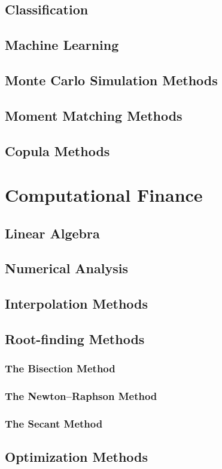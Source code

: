 \section{Classification}
\section{Machine Learning}
\section{Monte Carlo Simulation Methods}
\section{Moment Matching Methods}
\section{Copula Methods}

\chapter{Computational Finance}
\section{Linear Algebra}
\section{Numerical Analysis}
\section{Interpolation Methods}
\section{Root-finding Methods}
\subsection{The Bisection Method}
\subsection{The Newton--Raphson Method}
\subsection{The Secant Method}
\section{Optimization Methods}
